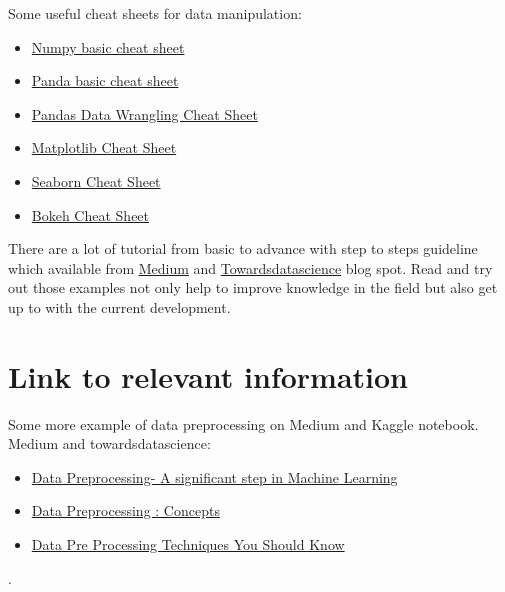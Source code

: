 \documentclass[a4paper,10pt]{article}
\begin{document}
Some useful cheat sheets for data manipulation:

\begin{itemize}
	\item \href{https://www.datacamp.com/community/blog/python-numpy-cheat-sheet}{Numpy basic cheat sheet}
	\item \href{https://www.datacamp.com/community/blog/python-pandas-cheat-sheet}{Panda basic cheat sheet}
	\item \href{https://www.datacamp.com/community/blog/pandas-cheat-sheet-python}{Pandas Data Wrangling Cheat Sheet}
	\item \href{https://www.datacamp.com/community/blog/python-matplotlib-cheat-sheet}{Matplotlib Cheat Sheet}
	\item \href{https://www.datacamp.com/community/blog/seaborn-cheat-sheet-python}{Seaborn Cheat Sheet}
	\item \href{https://s3.amazonaws.com/assets.datacamp.com/blog_assets/Python_Bokeh_Cheat_Sheet.pdf}{Bokeh Cheat Sheet}
\end{itemize}

There are a lot of tutorial from basic to advance with step to steps guideline which available from \href{https://medium.com/}{Medium} and \href{https://towardsdatascience.com/}{Towardsdatascience} blog spot. Read and try out those examples not only help to improve knowledge in the field but also get up to with the current development.



\medskip


\section{Link to relevant information}

Some more example of data preprocessing on Medium and Kaggle notebook.\newline
\newline
Medium and towardsdatascience:

\begin{itemize}
	\item \href{https://medium.com/datadriveninvestor/data-p-reprocessing-a-significant-step-in-machine-learning-a749ce7e2d07}{Data Preprocessing- A significant step in Machine Learning}
	\item \href{https://towardsdatascience.com/data-preprocessing-concepts-fa946d11c825}{Data Preprocessing : Concepts}
	\item \href{https://towardsdatascience.com/data-pre-processing-techniques-you-should-know-8954662716d6}{Data Pre Processing Techniques You Should Know}
\end{itemize}. \newline
\end{document}
